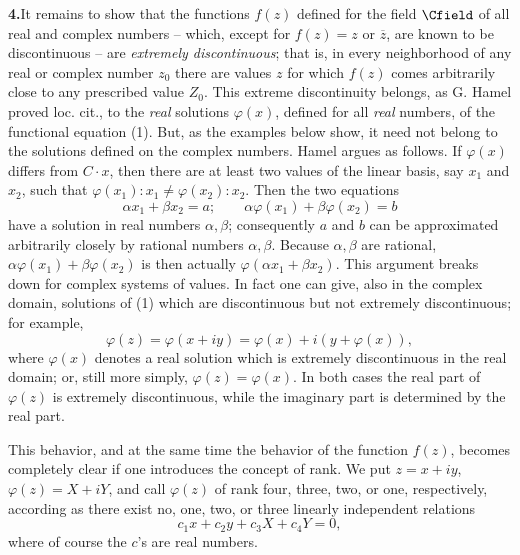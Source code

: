 \documentclass[11pt]{article}
\begin{document}
\medskip
\noindent\textbf{4.}\quad It remains to show that the functions \(f(z)\) defined for the field \(\Cfield\) of all real and complex numbers -- which, except for \(f(z)=z\) or \(\overline z\), are known to be discontinuous -- are \emph{extremely discontinuous}; that is, in every neighborhood of any real or complex number \(z_0\) there are values \(z\) for which \(f(z)\) comes arbitrarily close to any prescribed value \(Z_0\). This extreme discontinuity belongs, as G. Hamel proved loc. cit., to the \emph{real} solutions \(\varphi(x)\), defined for all \emph{real} numbers, of the functional equation (1). But, as the examples below show, it need not belong to the solutions defined on the complex numbers. Hamel argues as follows. If \(\varphi(x)\) differs from \(C\cdot x\), then there are at least two values of the linear basis, say \(x_1\) and \(x_2\), such that \(\varphi(x_1):x_1\ne\varphi(x_2):x_2\). Then the two equations
\[
\alpha x_1+\beta x_2=a;\qquad \alpha\varphi(x_1)+\beta\varphi(x_2)=b
\]
have a solution in real numbers \(\alpha,\beta\); consequently \(a\) and \(b\) can be approximated arbitrarily closely by rational numbers \(\alpha,\beta\). Because \(\alpha,\beta\) are rational, \(\alpha\varphi(x_1)+\beta\varphi(x_2)\) is then actually \(\varphi(\alpha x_1+\beta x_2)\). This argument breaks down for complex systems of values. In fact one can give, also in the complex domain, solutions of (1) which are discontinuous but not extremely discontinuous; for example,
\[
\varphi(z)=\varphi(x+iy)=\varphi(x)+i(y+\varphi(x)),
\]
where \(\varphi(x)\) denotes a real solution which is extremely discontinuous in the real domain; or, still more simply, \(\varphi(z)=\varphi(x)\). In both cases the real part of \(\varphi(z)\) is extremely discontinuous, while the imaginary part is determined by the real part.

This behavior, and at the same time the behavior of the function \(f(z)\), becomes completely clear if one introduces the concept of rank. We put \(z=x+iy\), \(\varphi(z)=X+iY\), and call \(\varphi(z)\) of rank four, three, two, or one, respectively, according as there exist no, one, two, or three linearly independent relations
\[
c_1x+c_2y+c_3X+c_4Y=0,
\]
where of course the \(c\)'s are real numbers.
\end{document}
